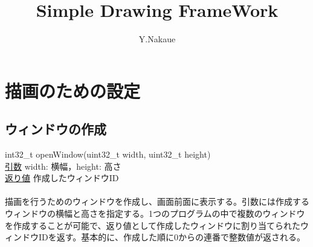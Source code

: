 \documentclass[a4paper, 11pt, oneside, onecolumn, openany]{jsarticle}
\begin{document}

\title{\vspace{-3cm}Simple Drawing FrameWork}
\author{Y.Nakaue}
\maketitle


\section{描画のための設定}
\subsection{ウィンドウの作成}
\noindent
\tab int32\_t openWindow(uint32\_t width, uint32\_t height) \\
\tab \underline{引数} \tab width: 横幅，height: 高さ \\
\tab \underline{返り値} \tab 作成したウィンドウID \\\\
描画を行うためのウィンドウを作成し、画面前面に表示する。引数には作成するウィンドウの横幅と高さを指定する。1つのプログラムの中で複数のウィンドウを作成することが可能で、返り値として作成したウィンドウに割り当てられたウィンドウIDを返す。基本的に、作成した順に0からの連番で整数値が返される。
\end{document}
